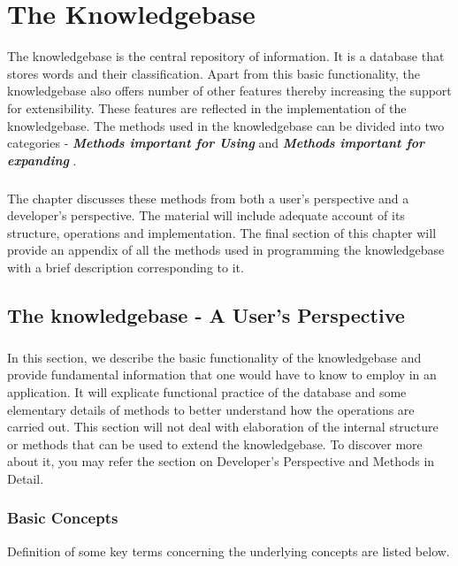 \chapter{The Knowledgebase}

The knowledgebase is the central repository of information. It is a database that stores words and their classification. Apart from this basic functionality, the knowledgebase also offers number of other features thereby increasing the support for extensibility.
These features are reflected in the implementation of the knowledgebase. The methods used in the knowledgebase can be divided into two categories - \textbf{\emph{Methods important for Using \libalf}} and \textbf{\emph{Methods important for expanding \libalf}}. 
\paragraph{}
The chapter discusses these methods from both a user's perspective and a developer's perspective. The material will include adequate account of its structure, operations and implementation.  The final section of this chapter will provide an appendix of all the methods used in programming the knowledgebase with a brief description corresponding to it.  
\vskip 1pt

\section{The knowledgebase - A User's Perspective}

\paragraph{} In this section, we describe the basic functionality of the knowledgebase and provide fundamental information that one would have to know to employ \libalf in an application. It will explicate functional practice of the database and some elementary details of methods to better understand how the operations are carried out. This section will not deal with elaboration of the internal structure or methods that can be used to extend the knowledgebase. To discover more about it, you may refer the section on Developer's Perspective and Methods in Detail.

\subsection*{Basic Concepts}
	
Definition of some key terms concerning the underlying concepts are listed below.


